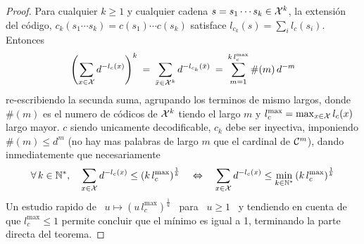 \begin{proof}
  Para cualquier $k \ge 1$ y cualquier  cadena $s = s_1 \cdots s_k \in \mathcal{X}^k$, la
  extensi\'on  del  c\'odigo,  $c_k(s_1  \cdots  s_k) =  c(s_1)  \cdots  c(s_k)$
  satisface $l_{c_k}(s) = \sum_i l_c(s_i)$. Entonces
  \[
  \left(  \sum_{x  \in \mathcal{X}}  d^{-l_c(x)}  \right)^k \:  =  \:  \sum_{\bar{x} \in  \mathcal{X}^k}
  d^{-l_{c_k}(\bar{x})} \: = \: \sum_{m=1}^{k \, l_c^{\max}} \#(m) \, d^{-m}
  \]
  re-escribiendo la secunda suma, agrupando  los terminos de mismo largos, donde
  $\#(m)$ es el numero de c\'odicos  de $\mathcal{X}^k$ tiendo el largo $m$ y $l_c^{\max}
  = \max_{x \in  \mathcal{X}} l_c(x)$ largo mayor.  $c$  siendo unicamente decodificable,
  $c_k$ debe ser  inyectiva, imponiendo $\#(m) \le d^m$ (no  hay mas palabras de
  largo $m$ que el cardinal de $\mathcal{C}^m$), dando inmediatemente que necesariamente
  \[
  \forall \,  k \in \mathbb{N}^*, \quad \sum_{x  \in \mathcal{X}} d^{-l_c(x)} \le  \left( k \,
    l_c^{\max}  \right)^{\frac1k} \quad  \Leftrightarrow \quad  \sum_{x  \in \mathcal{X}}
  d^{-l_c(x)} \le \min_{k \in \mathbb{N}^*} \left( k \, l_c^{\max} \right)^{\frac1k}
  \]
  Un estudio rapido de \ $u  \mapsto \left( u \, l_c^{\max} \right)^{\frac1u}$ \
  para \  $u \ge 1$ \  y tendiendo en cuenta  de que $l_c^{\max}  \le 1$ permite
  concluir  que el  m\'inimo  es igual  a  1, terminando  la  parte directa  del
  teorema.


\end{proof}
